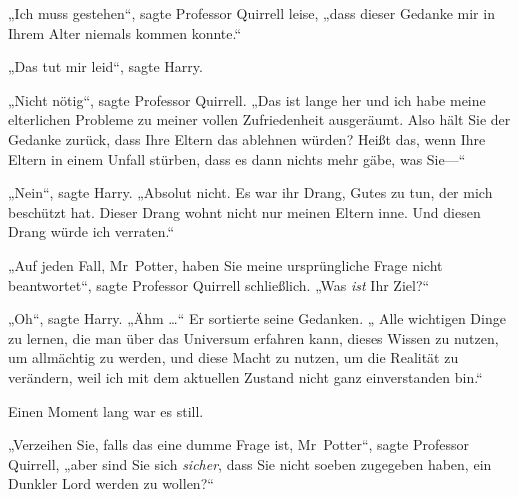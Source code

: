 „Ich muss gestehen“, sagte Professor Quirrell leise, „dass dieser Gedanke mir in Ihrem Alter niemals kommen konnte.“

„Das tut mir leid“, sagte Harry.

„Nicht nötig“, sagte Professor Quirrell. „Das ist lange her und ich habe meine elterlichen Probleme zu meiner vollen Zufriedenheit ausgeräumt. Also hält Sie der Gedanke zurück, dass Ihre Eltern das ablehnen würden? Heißt das, wenn Ihre Eltern in einem Unfall stürben, dass es dann nichts mehr gäbe, was Sie—“

„Nein“, sagte Harry. „Absolut nicht. Es war ihr Drang, Gutes zu tun, der mich beschützt hat. Dieser Drang wohnt nicht nur meinen Eltern inne. Und diesen Drang würde ich verraten.“

„Auf jeden Fall, Mr~Potter, haben Sie meine ursprüngliche Frage nicht beantwortet“, sagte Professor Quirrell schließlich. „Was \emph{ist} Ihr Ziel?“

„Oh“, sagte Harry. „Ähm …“ Er sortierte seine Gedanken. „ Alle wichtigen Dinge zu lernen, die man über das Universum erfahren kann, dieses Wissen zu nutzen, um allmächtig zu werden, und diese Macht zu nutzen, um die Realität zu verändern, weil ich mit dem aktuellen Zustand nicht ganz einverstanden bin.“

Einen Moment lang war es still.

„Verzeihen Sie, falls das eine dumme Frage ist, Mr~Potter“, sagte Professor Quirrell, „aber sind Sie sich \emph{sicher}, dass Sie nicht soeben zugegeben haben, ein Dunkler Lord werden zu wollen?“

